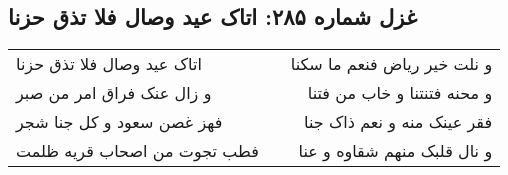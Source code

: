 \begin{center}
\section*{غزل شماره ۲۸۵: اتاک عید وصال فلا تذق حزنا}
\label{sec:0285}
\begin{longtable}{l p{0.5cm} r}
اتاک عید وصال فلا تذق حزنا
&&
و نلت خیر ریاض فنعم ما سکنا
\\
و زال عنک فراق امر من صبر
&&
و محنه فتنتنا و خاب من فتنا
\\
فهز غصن سعود و کل جنا شجر
&&
فقر عینک منه و نعم ذاک جنا
\\
فطب تجوت من اصحاب قریه ظلمت
&&
و نال قلبک منهم شقاوه و عنا
\\
\end{longtable}
\end{center}
